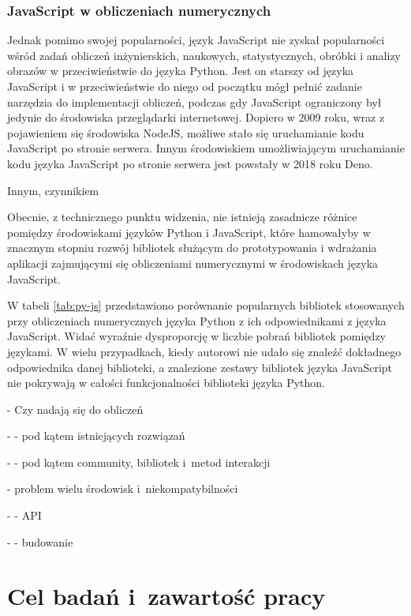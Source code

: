 \subsubsection{JavaScript w obliczeniach numerycznych}

Jednak pomimo swojej popularności, język JavaScript nie zyskał popularności wśród zadań obliczeń inżynierskich, naukowych, statystycznych, obróbki i analizy obrazów w przeciwieństwie do języka Python. Jest on starszy od języka JavaScript i w przeciwieństwie do niego od początku mógł pełnić zadanie narzędzia do implementacji obliczeń, podczas gdy JavaScript ograniczony był jedynie do środowiska przeglądarki internetowej. Dopiero w 2009 roku, wraz z pojawieniem się środowiska NodeJS, możliwe stało się uruchamianie kodu JavaScript po stronie serwera. Innym środowiskiem umożliwiającym uruchamianie kodu języka JavaScript po stronie serwera jest powstały w 2018 roku Deno. 

Innym, czynnikiem %

Obecnie, z technicznego punktu widzenia, nie istnieją zasadnicze różnice pomiędzy środowiskami języków Python i JavaScript, które hamowałyby w znacznym stopniu rozwój bibliotek służącym do prototypowania i wdrażania aplikacji zajmującymi się obliczeniami numerycznymi w środowiskach języka JavaScript. 

W tabeli \ref{tab:py-js} przedstawiono porównanie popularnych bibliotek stosowanych przy obliczeniach numerycznych języka Python z ich odpowiednikami z języka JavaScript. Widać wyraźnie dysproporcję w liczbie pobrań bibliotek pomiędzy językami. W wielu przypadkach, kiedy autorowi nie udało się znaleźć dokładnego odpowiednika danej biblioteki, a znalezione zestawy bibliotek języka JavaScript nie pokrywają w całości funkcjonalności biblioteki języka Python.

- Czy nadają się do obliczeń

- - pod kątem istniejących rozwiązań

- - pod kątem community, bibliotek i~metod interakcji

- problem wielu środowisk i~niekompatybilności

- - API

- - budowanie

\section{Cel badań i~zawartość pracy}


